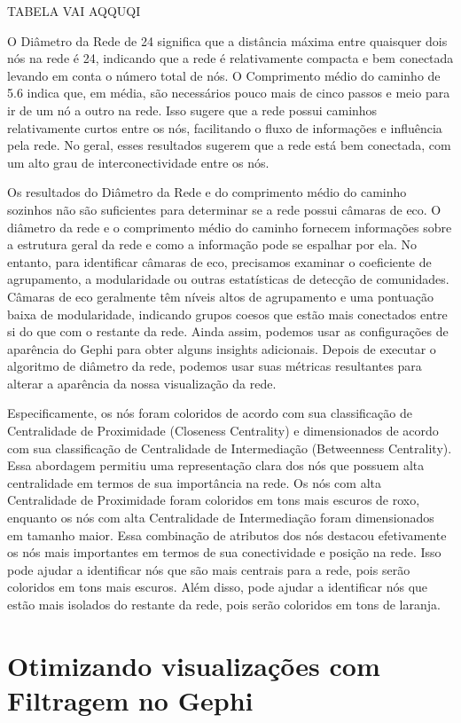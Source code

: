 TABELA VAI AQQUQI

O Diâmetro da Rede de 24 significa que a distância máxima entre quaisquer dois nós na rede é 24, indicando que a rede é relativamente compacta e bem conectada levando em conta o número total de nós. O Comprimento médio do caminho de 5.6 indica que, em média, são necessários pouco mais de cinco passos e meio para ir de um nó a outro na rede. Isso sugere que a rede possui caminhos relativamente curtos entre os nós, facilitando o fluxo de informações e influência pela rede. No geral, esses resultados sugerem que a rede está bem conectada, com um alto grau de interconectividade entre os nós.

Os resultados do Diâmetro da Rede e do comprimento médio do caminho sozinhos não são suficientes para determinar se a rede possui câmaras de eco. O diâmetro da rede e o comprimento médio do caminho fornecem informações sobre a estrutura geral da rede e como a informação pode se espalhar por ela. No entanto, para identificar câmaras de eco, precisamos examinar o coeficiente de agrupamento, a modularidade ou outras estatísticas de detecção de comunidades. Câmaras de eco geralmente têm níveis altos de agrupamento e uma pontuação baixa de modularidade, indicando grupos coesos que estão mais conectados entre si do que com o restante da rede. Ainda assim, podemos usar as configurações de aparência do Gephi para obter alguns insights adicionais. Depois de executar o algoritmo de diâmetro da rede, podemos usar suas métricas resultantes para alterar a aparência da nossa visualização da rede.

Especificamente, os nós foram coloridos de acordo com sua classificação de Centralidade de Proximidade (Closeness Centrality) e dimensionados de acordo com sua classificação de Centralidade de Intermediação (Betweenness Centrality). Essa abordagem permitiu uma representação clara dos nós que possuem alta centralidade em termos de sua importância na rede. Os nós com alta Centralidade de Proximidade foram coloridos em tons mais escuros de roxo, enquanto os nós com alta Centralidade de Intermediação foram dimensionados em tamanho maior. Essa combinação de atributos dos nós destacou efetivamente os nós mais importantes em termos de sua conectividade e posição na rede. Isso pode ajudar a identificar nós que são mais centrais para a rede, pois serão coloridos em tons mais escuros. Além disso, pode ajudar a identificar nós que estão mais isolados do restante da rede, pois serão coloridos em tons de laranja.

\section{Otimizando visualizações com Filtragem no Gephi}

